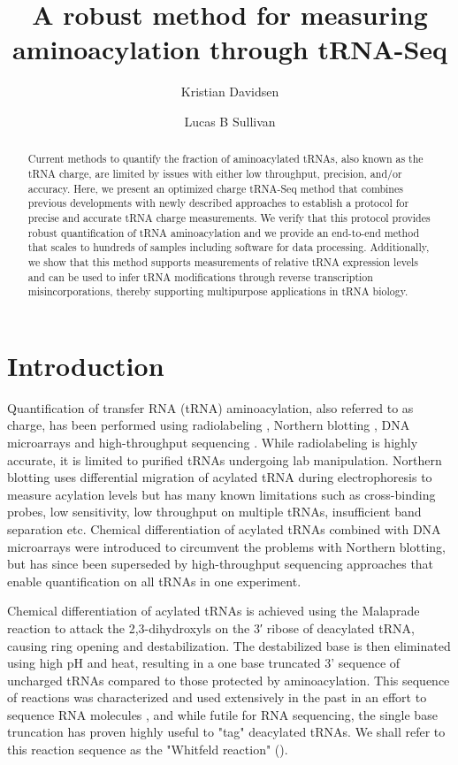 \documentclass[9pt,lineno]{elife}
\title{A robust method for measuring aminoacylation through tRNA-Seq}
\author[1,2]{Kristian Davidsen}
\author[1*]{Lucas B Sullivan}
\affil[1]{Fred Hutchinson Cancer Center}
\affil[2]{Molecular and cellular biology program, University of Washington}
\begin{document}
\maketitle

\begin{abstract}
Current methods to quantify the fraction of aminoacylated tRNAs, also known as the tRNA charge, are limited by issues with either low throughput, precision, and/or accuracy.
Here, we present an optimized charge tRNA-Seq method that combines previous developments with newly described approaches to establish a protocol for precise and accurate tRNA charge measurements.
We verify that this protocol provides robust quantification of tRNA aminoacylation and we provide an end-to-end method that scales to hundreds of samples including software for data processing.
Additionally, we show that this method supports measurements of relative tRNA expression levels and can be used to infer tRNA modifications through reverse transcription misincorporations, thereby supporting multipurpose applications in tRNA biology.
\end{abstract}






\section{Introduction}
Quantification of transfer RNA (tRNA) aminoacylation, also referred to as charge, has been performed using radiolabeling \citep{Wolfson2002-gp}, Northern blotting \citep{Ho1987-ug, Varshney1991-zp, Stenum2017-wn}, DNA microarrays \citep{Dittmar2005-va} and high-throughput sequencing \citep{Evans2017-st}.
While radiolabeling is highly accurate, it is limited to purified tRNAs undergoing lab manipulation.
Northern blotting uses differential migration of acylated tRNA during electrophoresis to measure acylation levels but has many known limitations such as cross-binding probes, low sensitivity, low throughput on multiple tRNAs, insufficient band separation etc.
Chemical differentiation of acylated tRNAs combined with DNA microarrays were introduced to circumvent the problems with Northern blotting, but has since been superseded by high-throughput sequencing approaches that enable quantification on all tRNAs in one experiment.

Chemical differentiation of acylated tRNAs is achieved using the Malaprade reaction to attack the 2,3-dihydroxyls on the 3′ ribose of deacylated tRNA, causing ring opening and destabilization.
The destabilized base is then eliminated using high pH and heat, resulting in a one base truncated 3' sequence of uncharged tRNAs compared to those protected by aminoacylation.
This sequence of reactions was characterized and used extensively in the past in an effort to sequence RNA molecules \citep{Whitfeld1953-ca, Whitfeld1954-wl, Khym1961-xf, Neu1964-hu}, and while futile for RNA sequencing, the single base truncation has proven highly useful  to "tag" deacylated tRNAs.
We shall refer to this reaction sequence as the "Whitfeld reaction" ().
\end{document}
